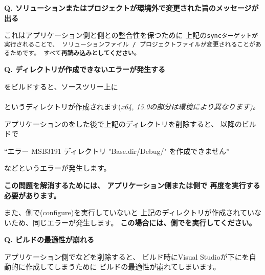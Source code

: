 \bf{Q. ソリューションまたはプロジェクトが環境外で変更された旨のメッセージが出る}

\medskip
これはアプリケーション側と\SprLib 側との整合性を保つために
上記の\tt{sync}ターゲットが実行されることで、
ソリューションファイル / プロジェクトファイルが変更されることがあるためです。
すべて\bf{再読み込み}としてください。


\thinrule{\linewidth}

\bf{Q. ディレクトリが作成できないエラーが発生する}

\medskip
\SprLib をビルドすると、ソースツリー上に \\
\hspace{10pt} \\
というディレクトリが作成されます(\it{x64}, \it{15.0}の部分は環境により異なります)。

アプリケーションの\cmake をした後で上記のディレクトリを削除すると、
以降のビルドで

\hspace{20pt}``エラー MSB3191 ディレクトリ "Base.dir/Debug/" を作成できません''

などというエラーが発生します。

\bf{この問題を解消するためには、
アプリケーション側または\SprLib 側で 再度\cmake を実行する必要があります。}

また、\SprLib 側で\cmake (configure)を実行していないと 
上記のディレクトリが作成されていないため、同じエラーが発生します。
\bf{この場合には、\SprLib 側で\cmake を実行してください。}

\thinrule{\linewidth}

\bf{Q. ビルドの最適性が崩れる}
\label{subsec:QandA:CrumbleBuildOptimizeation}

\medskip
アプリケーション側でなどを削除すると、
ビルド時にVisual Studioが\BldDir 下にを自動的に作成してしまうために
ビルドの最適性が崩れてしまいます。

